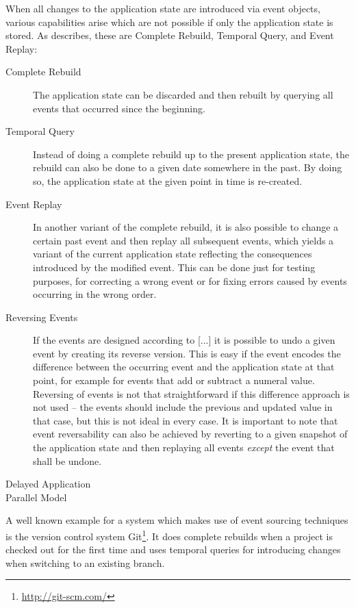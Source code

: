 When all changes to the application state are introduced via event objects, various capabilities arise which are not possible if only the application state is stored.
As \citet{WEB:Fowler:2005} describes, these are Complete Rebuild, Temporal Query, and Event Replay:

\begin{description}
\item [Complete Rebuild]
The application state can be discarded and then rebuilt by querying all events that occurred since the beginning.
\item [Temporal Query]
Instead of doing a complete rebuild up to the present application state, the rebuild can also be done to a given date somewhere in the past.
By doing so, the application state at the given point in time is re-created.
\item [Event Replay]
In another variant of the complete rebuild, it is also possible to change a certain past event and then replay all subsequent events, which yields a variant of the current application state reflecting the consequences introduced by the modified event.
This can be done just for testing purposes, for correcting a wrong event or for fixing errors caused by events occurring in the wrong order.
\item [Reversing Events]
If the events are designed according to [...] it is possible to undo a given event by creating its reverse version.
This is easy if the event encodes the difference between the occurring event and the application state at that point, for example for events that add or subtract a numeral value.
Reversing of events is not that straightforward if this difference approach is not used -- the events should include the previous and updated value in that case, but this is not ideal in every case.
It is important to note that event reversability can also be achieved by reverting to a given snapshot of the application state and then replaying all events \emph{except} the event that shall be undone.
\item [Delayed Application]
\item [Parallel Model]
\end{description}

A well known example for a system which makes use of event sourcing techniques is the version control system Git\footnote{\url{http://git-scm.com/}}.
It does complete rebuilds when a project is checked out for the first time and uses temporal queries for introducing changes when switching to an existing branch. 

